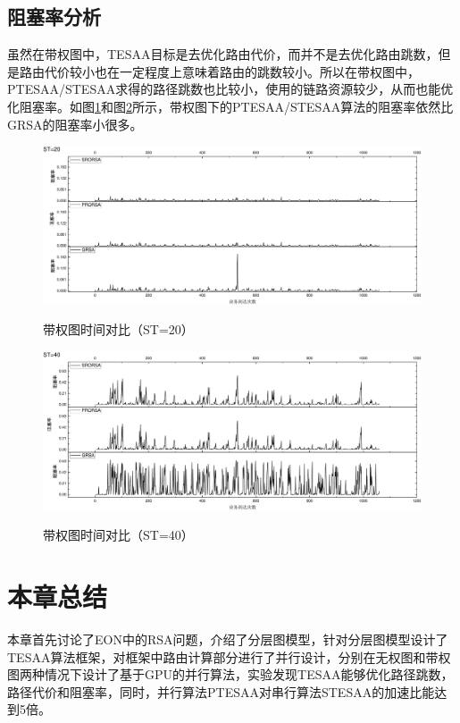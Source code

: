 \subsection{阻塞率分析}
虽然在带权图中，TESAA目标是去优化路由代价，而并不是去优化路由跳数，但是路由代价较小也在一定程度上意味着路由的跳数较小。所以在带权图中，PTESAA/STESAA求得的路径跳数也比较小，使用的链路资源较少，从而也能优化阻塞率。如图\ref{H20Z}和图\ref{H40Z}所示，带权图下的PTESAA/STESAA算法的阻塞率依然比GRSA的阻塞率小很多。
\begin{figure}
\setlength{\belowcaptionskip}{-0.5cm}
\begin{center}
{\includegraphics[width=1 \textwidth]{figures/H20Z.pdf}}
\end{center}
\caption{{\footnotesize{带权图时间对比（ST=20）}}}
\label{H20Z}
\end{figure}
\begin{figure}
\setlength{\belowcaptionskip}{-0.5cm}
\begin{center}
{\includegraphics[width=1 \textwidth]{figures/H40Z.pdf}}
\end{center}
\caption{{\footnotesize{带权图时间对比（ST=40）}}}
\label{H40Z}
\end{figure}
\section{本章总结}
本章首先讨论了EON中的RSA问题，介绍了分层图模型，针对分层图模型设计了TESAA算法框架，对框架中路由计算部分进行了并行设计，分别在无权图和带权图两种情况下设计了基于GPU的并行算法，实验发现TESAA能够优化路径跳数，路径代价和阻塞率，同时，并行算法PTESAA对串行算法STESAA的加速比能达到5倍。
